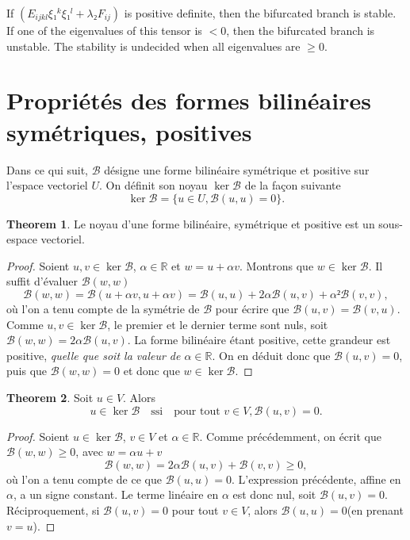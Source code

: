 \documentclass[12pt, final]{scrartcl}
\theoremstyle{definition}
\newtheorem{theorem}{Theorem}
\newcommand{\reals}{\mathbb{R}}
\begin{document}
If \((E_{ijkl} ξ₁^k ξ₁^l + λ₂ F_{ij} )\) is positive definite, then the
bifurcated branch is stable. If one of the eigenvalues of this tensor is \(<0\),
then the bifurcated branch is unstable. The stability is undecided when all
eigenvalues are \(≥ 0\).

\section{Propriétés des formes bilinéaires symétriques, positives}

Dans ce qui suit, \(\mathcal{B}\) désigne une forme bilinéaire symétrique et
positive sur l'espace vectoriel \(U\). On définit son noyau \(\ker \mathcal{B}\)
de la façon suivante
\begin{equation}
 \ker \mathcal{B}= \bigl\{ u ∈ U, \mathcal{B}(u, u) = 0 \bigr\} .
\end{equation}

\begin{theorem}
  Le noyau d'une forme bilinéaire, symétrique et positive est un sous-espace
  vectoriel.
\end{theorem}
\begin{proof}
  Soient \(u, v∈\ker \mathcal{B}\), \(α∈\reals\) et \(w = u + α v\). Montrons
  que \(w ∈ \ker\mathcal{B}\). Il suffit d'évaluer \(\mathcal{B}(w, w)\)
 \begin{equation}
   \mathcal{B}(w, w) = \mathcal{B}(u + α v, u + α v)
   = \mathcal{B}(u, u) + 2 α \mathcal{B}(u, v) + α² \mathcal{B}(v, v),
 \end{equation}
 où l'on a tenu compte de la symétrie de \(\mathcal{B}\) pour écrire que
 \(\mathcal{B}(u, v) =\mathcal{B}(v, u)\). Comme \(u, v ∈ \ker\mathcal{B}\), le
 premier et le dernier terme sont nuls, soit
 \(\mathcal{B}(w, w) = 2α \mathcal{B}(u, v)\). La forme bilinéaire étant
 positive, cette grandeur est positive, \emph{quelle que soit la valeur de
   \(α∈\reals\)}. On en déduit donc que \(\mathcal{B}(u, v) = 0\), puis que
 \(\mathcal{B}(w, w) = 0\) et donc que \(w ∈ \ker\mathcal{B}\).
\end{proof}

\begin{theorem}
 Soit \(u∈V\). Alors
 \begin{equation}
  u ∈ \ker\mathcal{B} \quad \text{ssi} \quad \text{pour tout } v ∈ V, \mathcal{B}(u, v) = 0.
 \end{equation}
\end{theorem}

\begin{proof}
  Soient \(u∈\ker \mathcal{B}\), \(v∈V\) et \(α∈\reals\). Comme précédemment, on
  écrit que \(\mathcal{B}(w, w) ≥ 0\), avec \(w = α u + v\)
 \begin{equation}
  \mathcal{B}(w, w) = 2 α \mathcal{B}(u, v) +\mathcal{B}(v, v) \geq
  0,
 \end{equation}
 où l'on a tenu compte de ce que \(\mathcal{B}(u, u) = 0\). L'expression
 précédente, affine en \(α\), a un signe constant. Le terme linéaire en \(α\)
 est donc nul, soit \(\mathcal{B}(u, v) = 0\).  Réciproquement, si
 \(\mathcal{B}(u, v) = 0\) pour tout \(v∈V\), alors \(\mathcal{B}(u, u) = 0\)(en
 prenant \(v = u\)).
\end{proof}
\end{document}
